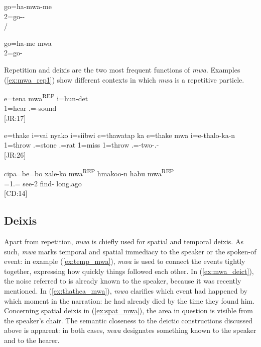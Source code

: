 \ea \label{ex:movV-mwa}
\gll go=ha-mwa-me\\
2=go--\\
\glt {}\slash{}
\z

\ea
\gll go=ha-me mwa\\
2=go- \\
\glt {}
\z


Repetition and deixis are the two most frequent functions of \textit{mwa}. Examples (\ref{ex:mwa_rep1}) show different contexts in which \textit{mwa} is a repetitive particle.%

\ea \label{ex:mwa_rep1}    
\gll e=tena mwa\textsuperscript{{\upshape REP}} i=hun-det\\ 1=hear  .=-sound\\
\glt {} {[JR:17]}
\z

\ea\label{ex:mwa_rep2}     
\gll e=thake i=vai nyako i=siibwi e=thawatap ka e=thake mwa i=e-thalo-ka-n\\
 1=throw .=stone  .=rat 1=miss  1=throw  .=-two-.-\\
\glt {} {[JR:26]}
    \z

\ea             
\gll	cipa=be=bo xale-ko mwa\textsuperscript{{\upshape REP}} hmakoo-n habu mwa\textsuperscript{{\upshape REP}}\\
	=1.= see-2  find- long.ago \\
\glt {} {[CD:14]}
\z 


\subsection{Deixis}
Apart from repetition, \textit{mwa} is chiefly used for spatial and temporal deixis. %
As such, \textit{mwa} marks temporal and spatial immediacy to the speaker or the spoken-of event: in example (\ref{ex:temp_mwa}), \textit{mwa} is used to connect the events tightly together, expressing how quickly things followed each other. In (\ref{ex:mwa_deict}), the noise referred to is already known to the speaker, because it was recently mentioned. In (\ref{ex:thathea_mwa}), \textit{mwa} clarifies which event had happened by which moment in the narration: he had already died by the time they found him. Concerning spatial deixis in (\ref{ex:spat_mwa}), the area in question is visible from the speaker's chair. The semantic closeness to the deictic constructions discussed above is apparent: in both cases, \textit{mwa} designates something known to the speaker and to the hearer.

